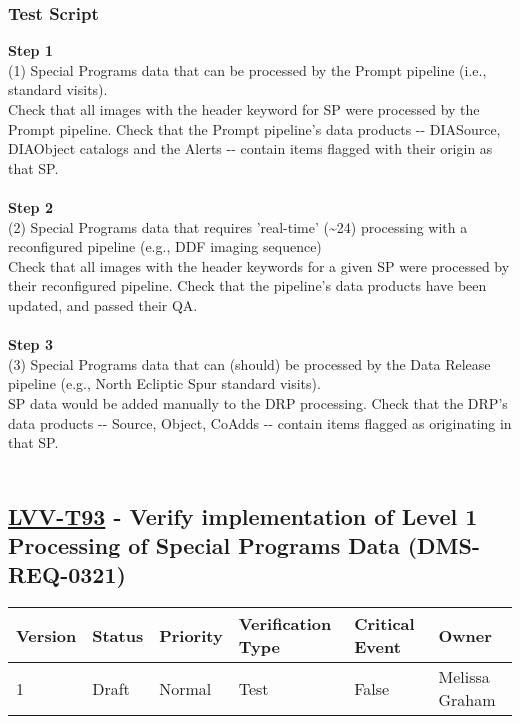 \hypertarget{test-script-69}{%
\subsubsection{Test Script}\label{test-script-69}}

\textbf{Step 1}\\
(1) Special Programs data that can be processed by the Prompt pipeline
(i.e., standard visits).\\
Check that all images with the header keyword for SP were processed by
the Prompt pipeline. Check that the Prompt pipeline's data products -\/-
DIASource, DIAObject catalogs and the Alerts -\/- contain items flagged
with their origin as that SP.\\
~\\
\textbf{Step 2}\\
(2) Special Programs data that requires 'real-time'
(\textasciitilde{}24) processing with a reconfigured pipeline (e.g., DDF
imaging sequence)\\
Check that all images with the header keywords for a given SP were
processed by their reconfigured pipeline. Check that the pipeline's data
products have been updated, and passed their QA.\\
~\\
\textbf{Step 3}\\
(3) Special Programs data that can (should) be processed by the Data
Release pipeline (e.g., North Ecliptic Spur standard visits).\\
SP data would be added manually to the DRP processing. Check that the
DRP's data products -\/- Source, Object, CoAdds -\/- contain items
flagged as originating in that SP.\\
~\\

\hypertarget{lvv-t93---verify-implementation-of-level-1-processing-of-special-programs-data-dms-req-0321}{%
\subsection{\texorpdfstring{\href{https://jira.lsstcorp.org/secure/Tests.jspa\#/testCase/LVV-T93}{LVV-T93}
- Verify implementation of Level 1 Processing of Special Programs Data
(DMS-REQ-0321)}{LVV-T93 - Verify implementation of Level 1 Processing of Special Programs Data (DMS-REQ-0321)}}\label{lvv-t93---verify-implementation-of-level-1-processing-of-special-programs-data-dms-req-0321}}

\begin{longtable}[]{@{}llllll@{}}
\toprule
Version & Status & Priority & Verification Type & Critical Event &
Owner\tabularnewline
\midrule
\endhead
1 & Draft & Normal & Test & False & Melissa Graham\tabularnewline
\bottomrule
\end{longtable}

